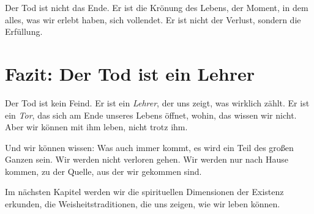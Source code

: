 Der Tod ist nicht das Ende. Er ist die Krönung des Lebens, der Moment, in dem alles, was wir erlebt haben, sich vollendet. Er ist nicht der Verlust, sondern die Erfüllung.

\section{Fazit: Der Tod ist ein Lehrer}

Der Tod ist kein Feind. Er ist ein \emph{Lehrer}, der uns zeigt, was wirklich zählt. Er ist ein \emph{Tor}, das sich am Ende unseres Lebens öffnet, wohin, das wissen wir nicht. Aber wir können mit ihm leben, nicht trotz ihm.

Und wir können wissen: Was auch immer kommt, es wird ein Teil des großen Ganzen sein. Wir werden nicht verloren gehen. Wir werden nur \glqq nach Hause\grqq{} kommen, zu der Quelle, aus der wir gekommen sind.

Im nächsten Kapitel werden wir die spirituellen Dimensionen der Existenz erkunden, die Weisheitstraditionen, die uns zeigen, wie wir leben können.

